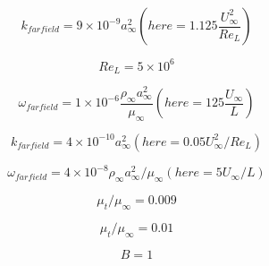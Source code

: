 

\begin{equation}
k_{farfield} = 9 \times 10^{-9} a_{\infty}^2 \left(here = 1.125 \frac{U_{\infty}^2}{Re_L} \right)
\end{equation}

\begin{equation}
Re_L = 5 \times 10^6
\end{equation}

\begin{equation}
\omega_{farfield} = 1 \times 10^{-6} \frac{\rho_{\infty}a_{\infty}^2}{\mu_{\infty}} \left(here =
  125 \frac{U_{\infty}}{L} \right)
\end{equation}

\begin{equation}
k_{farfield} = 4 \times 10^{-10} a_{\infty}^2 \left(here = 0.05 U_{\infty}^2/Re_L \right)
\end{equation}

\begin{equation}
\omega_{farfield} = 4 \times 10^{-8} \rho_{\infty}a_{\infty}^2/\mu_{\infty} \left(here =
  5 U_{\infty}/L \right)
\end{equation}

\begin{equation}
\mu_t/\mu_{\infty} = 0.009
\end{equation}

\begin{equation}
\mu_t/\mu_{\infty} = 0.01
\end{equation}

\begin{equation}
B=1
\end{equation}


